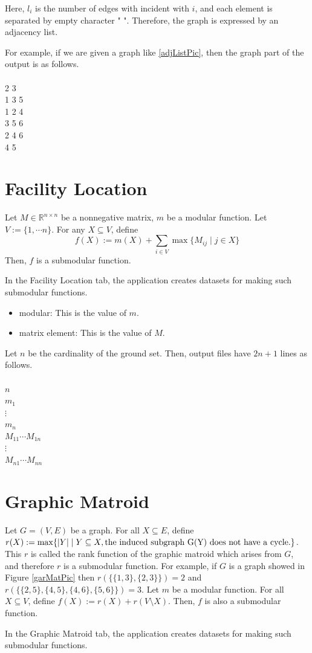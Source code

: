 \documentclass{article}
\newcommand{\re}{\mathbb{R}}
\newcommand{\modular}{modular: This is the value of $m$.
}
\newcommand{\exTab}[1]{
In the #1 tab,
the application creates datasets for making such submodular functions.}
\newcommand{\out}[1]{
Let $n$ be the cardinality of the ground set.
Then, output files have $#1$ lines as follows.\\ \mbox{}\\
}
\begin{document}
Here, $l_i$ is the number of edges with incident with $i$,
and each element is separated by empty character " ".
Therefore, the graph is expressed by an adjacency list.


For example, if we are given a graph like \ref{adjListPic},
then the graph part of the output is as follows.
\mbox{}\\
\mbox{}\\
2 3\\
1 3 5\\
1 2 4\\
3 5 6\\
2 4 6\\
4 5\\


\newpage

\section{Facility Location}\label{facilityLocationSec}
Let $M\in \re^{n\times n}$ be a nonnegative matrix,
$m$ be a modular function.
Let $V:=\{1,\cdots n\}$.
For any $X\subseteq V$,
define 
\[
f(X) := m(X)   + \sum_{i\in V} \max \{M_{ij} \mid j\in X \}  \nonumber
\]
Then, $f$ is a submodular function.
\exTab{Facility Location}

\begin{itemize}
\item \modular
\item matrix element: This is the value of $M$.
\end{itemize}

\out{2n+1}
$n$\\
$m_1$ \\
$\vdots$ \\
$m_n$ \\
$M_{11}\cdots M_{1n}$\\
\mbox{\quad \quad}$\vdots$ \\
$M_{n1} \cdots M_{nn}$ \\


\newpage

\section{Graphic Matroid}\label{graphicMatroidSec}
Let $G=(V,E)$ be a graph.
For all $X\subseteq E$,
define $r(X):=\max \{ |Y| \mid Y\subseteq X, {\rm the~induced~subgraph~G(Y)~does~not~have~a~cycle.} \}$.
This $r$ is called the rank function of the graphic matroid which arises from $G$,
and therefore $r$ is a submodular function.
For example,
if $G$ is a graph showed in Figure \ref{garMatPic} then
$r(\{ \{1,3\},\{2,3\} \})=2$ and $r(\{ \{2,5\},\{4,5\},\{4,6\},\{5,6\} \})=3$.
Let $m$ be a modular function.
For all $X\subseteq V$,
define $f(X):=r(X)+r(V\setminus X)$.
Then, $f$ is also a submodular function.
\exTab{Graphic Matroid}
\end{document}
